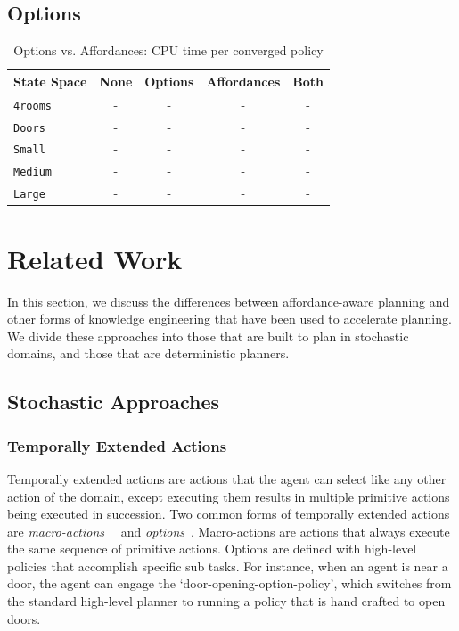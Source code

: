 \documentclass[conference]{IEEEtran}
\begin{document}
\subsection{Options}

\begin{table}[H]
\centering
\begin{tabular}{ l || c c c c }
  State Space 		& None & Options & Affordances & Both 	 	\\ \hline
  \texttt{4rooms}  	& 	-		&	-	&	-	&	-	\\
  \texttt{Doors}  		& 	-		&	-	&	-	&	-	\\
  \texttt{Small}  		& 	-		&	-	&	-	&	-	\\
  \texttt{Medium}  	& 	-		&	-	&	-	&	-	\\
  \texttt{Large}  		& 	-		&	-	&	-	&	-	\\
\end{tabular}
\caption{Options vs. Affordances: CPU time per converged policy}
\label{table:minecraft_results_cpu}
\end{table}

\section{Related Work}
\label{sec:related-work}

In this section, we discuss the differences between
affordance-aware planning and other forms of knowledge engineering that
have been used to accelerate planning. We divide these approaches
into those that are built to plan in stochastic domains, and those that are
deterministic planners.

\subsection{Stochastic Approaches}

\subsubsection{Temporally Extended Actions}
Temporally extended actions are actions that the agent can
select like any other action of the domain, except executing them
results in multiple primitive actions being executed in
succession. Two common forms of temporally extended actions are {\em
  macro-actions}~\cite{hauskrecht98} ~and {\em options}~\cite{sutton99}. 
Macro-actions are actions that always
execute the same sequence of primitive actions. Options are defined
with high-level policies that accomplish specific sub tasks. For
instance, when an agent is near a door, the agent can engage the
`door-opening-option-policy', which switches from the standard
high-level planner to running a policy that is hand crafted to open
doors. 
\end{document}

